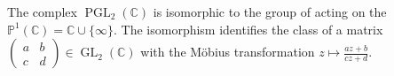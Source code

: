\begin{proposition} \label{proposition:structure_of_PGL_2_of_C_as_mobius_transformations}
The complex  $\operatorname{PGL}_2(\mathbb{C})$ is isomorphic to the group of  acting on the  $\mathbb{P}^1(\mathbb{C}) = \mathbb{C} \cup \{\infty\}$. The isomorphism identifies the class of a matrix $\begin{pmatrix} a & b \\ c & d \end{pmatrix} \in \operatorname{GL}_2(\mathbb{C})$ with the Möbius transformation $z \mapsto \frac{az + b}{cz + d}$.
\end{proposition}
